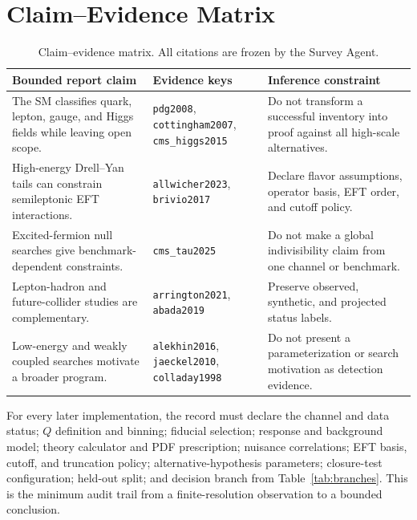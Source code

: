 \section{Claim--Evidence Matrix}

\begin{table}[!t]
\caption{Claim--evidence matrix. All citations are frozen by the Survey Agent.}
\label{tab:evidence}
\centering
\footnotesize
\begin{tabularx}{\textwidth}{p{}p{}Y}
\toprule
\textbf{Bounded report claim} & \textbf{Evidence keys} & \textbf{Inference constraint}\\
\midrule
The SM classifies quark, lepton, gauge, and Higgs fields while leaving open scope. & \texttt{pdg2008}, \texttt{cottingham2007}, \texttt{cms\_higgs2015} & Do not transform a successful inventory into proof against all high-scale alternatives.\\
High-energy Drell--Yan tails can constrain semileptonic EFT interactions. & \texttt{allwicher2023}, \texttt{brivio2017} & Declare flavor assumptions, operator basis, EFT order, and cutoff policy.\\
Excited-fermion null searches give benchmark-dependent constraints. & \texttt{cms\_tau2025} & Do not make a global indivisibility claim from one channel or benchmark.\\
Lepton-hadron and future-collider studies are complementary. & \texttt{arrington2021}, \texttt{abada2019} & Preserve observed, synthetic, and projected status labels.\\
Low-energy and weakly coupled searches motivate a broader program. & \texttt{alekhin2016}, \texttt{jaeckel2010}, \texttt{colladay1998} & Do not present a parameterization or search motivation as detection evidence.\\
\bottomrule
\end{tabularx}
\end{table}

For every later implementation, the record must declare the channel and data status; $Q$ definition and binning; fiducial selection; response and background model; theory calculator and PDF prescription; nuisance correlations; EFT basis, cutoff, and truncation policy; alternative-hypothesis parameters; closure-test configuration; held-out split; and decision branch from Table~\ref{tab:branches}. This is the minimum audit trail from a finite-resolution observation to a bounded conclusion.

